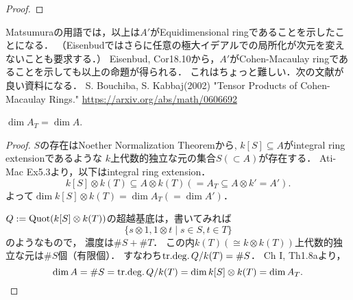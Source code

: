 \documentclass[a4paper]{jsarticle}
\begin{document}
\begin{proof}


    \end{proof}
    \begin{Remark}
        Matsumuraの用語では，以上は$A'$がEquidimensional ringであることを示したことになる．
        （Eisenbudではさらに任意の極大イデアルでの局所化が次元を変えないことも要求する．）
        Eisenbud, Cor18.10から，$A'$がCohen-Macaulay ringであることを示しても以上の命題が得られる．
        これはちょっと難しい．次の文献が良い資料になる．
        S. Bouchiba, S. Kabbaj(2002) "Tensor Products of Cohen-Macaulay Rings."
        \url{https://arxiv.org/abs/math/0606692}
    \end{Remark}

    \begin{Claim}[2]
        $\dim A_T=\dim A$.
    \end{Claim}
    \begin{proof}
    $S$の存在はNoether Normalization Theoremから,
    $k[S] \subseteq A$がintegral ring extensionであるような
    $k$上代数的独立な元の集合$S(\subset A)$が存在する．
    Ati-Mac Ex5.3より，以下はintegral ring extension．
    \[ k[S] \otimes k(T) \subseteq A \otimes k(T) (=A_T \subseteq A \otimes k'=A'). \]
    よって$\dim k[S] \otimes k(T)=\dim A_T(=\dim A')$．

    $Q:=\operatorname{Quot}(k[S] \otimes k(T))$の超越基底は，書いてみれば
    \[ \{s \otimes 1, 1 \otimes t \mid s \in S, t \in T\} \]のようなもので，
    濃度は$\#S+\#T$．
    この内$k(T)(\cong k \otimes k(T))$上代数的独立な元は$\#S$個（有限個）．
    すなわち$\mathrm{tr.deg.\,} Q/k(T)=\#S$．
    Ch I, Th1.8aより，
    \[ \dim A=\#S=\mathrm{tr.deg.\,} Q/k(T)=\dim k[S] \otimes k(T)=\dim A_T. \]
    \end{proof}
\end{document}
